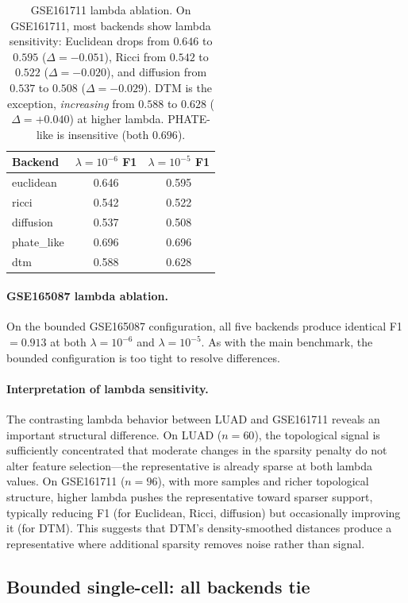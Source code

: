 \documentclass[11pt]{article}
\begin{document}
\begin{table}[h]
\centering
\small
\begin{tabular}{lcc}
\toprule
Backend & $\lambda = 10^{-6}$ F1 & $\lambda = 10^{-5}$ F1 \\
\midrule
euclidean & 0.646 & 0.595 \\
ricci & 0.542 & 0.522 \\
diffusion & 0.537 & 0.508 \\
phate\_like & 0.696 & 0.696 \\
dtm & 0.588 & 0.628 \\
\bottomrule
\end{tabular}
\caption{GSE161711 lambda ablation.
On GSE161711, most backends show lambda sensitivity: Euclidean drops from $0.646$ to $0.595$ ($\Delta = -0.051$), Ricci from $0.542$ to $0.522$ ($\Delta = -0.020$), and diffusion from $0.537$ to $0.508$ ($\Delta = -0.029$).
DTM is the exception, \emph{increasing} from $0.588$ to $0.628$ ($\Delta = +0.040$) at higher lambda.
PHATE-like is insensitive (both $0.696$).}
\label{tab:lambda_gse}
\end{table}

\paragraph{GSE165087 lambda ablation.}
On the bounded GSE165087 configuration, all five backends produce identical F1 $= 0.913$ at both $\lambda = 10^{-6}$ and $\lambda = 10^{-5}$.
As with the main benchmark, the bounded configuration is too tight to resolve differences.

\paragraph{Interpretation of lambda sensitivity.}
The contrasting lambda behavior between LUAD and GSE161711 reveals an important structural difference.
On LUAD ($n = 60$), the topological signal is sufficiently concentrated that moderate changes in the sparsity penalty do not alter feature selection---the representative is already sparse at both lambda values.
On GSE161711 ($n = 96$), with more samples and richer topological structure, higher lambda pushes the representative toward sparser support, typically reducing F1 (for Euclidean, Ricci, diffusion) but occasionally improving it (for DTM).
This suggests that DTM's density-smoothed distances produce a representative where additional sparsity removes noise rather than signal.

\subsection{Bounded single-cell: all backends tie}
\end{document}

